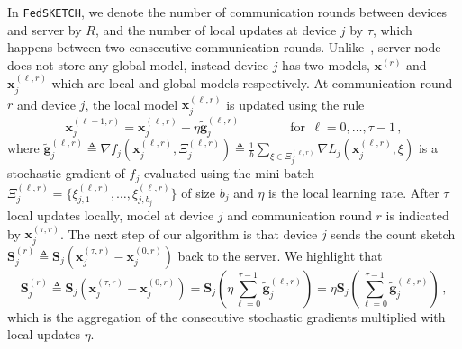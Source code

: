 \documentclass[twoside]{article}
\begin{document}
In \texttt{FedSKETCH}, we denote the number of communication rounds between devices and server by $R$, and the number of local updates at device $j$ by $\tau$, which happens between two consecutive communication rounds. Unlike~\cite{haddadpour2020federated}, server node does not store any global model, instead device $j$ has two models, $\boldsymbol{x}^{(r)}$ and $\boldsymbol{x}^{(\ell,r)}_j$ which are local and global models respectively. 
At communication round $r$ and device $j$, the local model $\boldsymbol{x}^{(\ell,r)}_j$ is updated using the rule $$\boldsymbol{x}_j^{(\ell+1,r)}=\boldsymbol{x}_j^{(\ell,r)}-\eta \tilde{\mathbf{g}}_j^{(\ell,r)} \qquad\qquad \text{for}\:\:\ell=0,\ldots,\tau-1\, , $$
where $\tilde{\mathbf{g}}_j^{(\ell,r)}\triangleq\nabla{f}_j(\boldsymbol{x}_j^{(\ell,r)},\Xi_j^{(\ell,r)})\triangleq\frac{1}{b}\sum_{\xi\in\Xi_j^{(\ell,r)}}\nabla{L}_j(\boldsymbol{x}_j^{(\ell,r)},\xi)$ is a stochastic gradient of $f_j$ evaluated using the mini-batch $\Xi_j^{(\ell,r)}=\{\xi^{(\ell,r)}_{j,1},\ldots,\xi^{(\ell,r)}_{j,b_j} \}$ of size $b_j$ and $\eta$ is the local learning rate. After $\tau$ local updates locally, model at device $j$ and communication round $r$ is indicated by $\boldsymbol{x}_j^{(\tau,r)}$. The next step of our algorithm is that device $j$ sends the count sketch $\mathbf{S}_j^{(r)}\triangleq\mathbf{S}_j\left(\boldsymbol{x}_j^{(\tau,r)}-\boldsymbol{x}_j^{(0,r)}\right)$ back to the server. We highlight that $$\mathbf{S}_j^{(r)}\triangleq\mathbf{S}_j\left(\boldsymbol{x}_j^{(\tau,r)}-\boldsymbol{x}_j^{(0,r)}\right)=\mathbf{S}_j\left(\eta\sum_{\ell=0}^{\tau-1}\tilde{\mathbf{g}}_j^{(\ell,r)}\right)=\eta\mathbf{S}_j\left(\sum_{\ell=0}^{\tau-1}\tilde{\mathbf{g}}_j^{(\ell,r)}\right)\, ,$$ which is the aggregation of the consecutive stochastic gradients multiplied with local updates $\eta$.
\end{document}

